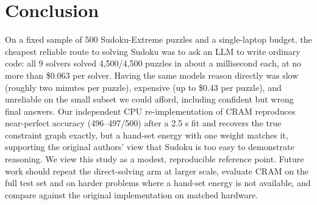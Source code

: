 \documentclass{article} %
\begin{document}
\section{Conclusion}
\label{sec:conclusion}
On a fixed sample of 500 Sudoku-Extreme puzzles and a single-laptop budget, the cheapest reliable route to solving Sudoku was to ask an LLM to write ordinary code: all 9 solvers solved 4,500/4,500 puzzles in about a millisecond each, at no more than \$0.063 per solver. Having the same models reason directly was slow (roughly two minutes per puzzle), expensive (up to \$0.43 per puzzle), and unreliable on the small subset we could afford, including confident but wrong final answers. Our independent CPU re-implementation of CRAM reproduces near-perfect accuracy (496--497/500) after a 2.5 s fit and recovers the true constraint graph exactly, but a hand-set energy with one weight matches it, supporting the original authors' view that Sudoku is too easy to demonstrate reasoning. We view this study as a modest, reproducible reference point. Future work should repeat the direct-solving arm at larger scale, evaluate CRAM on the full test set and on harder problems where a hand-set energy is not available, and compare against the original implementation on matched hardware.



\end{document}
